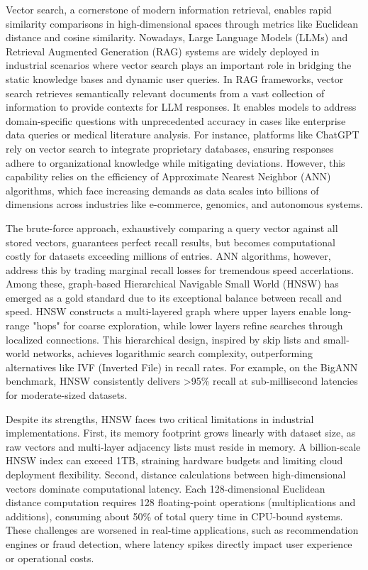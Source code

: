 \documentclass[sigconf, nonacm]{acmart}
\begin{document}
Vector search, a cornerstone of modern information retrieval, enables rapid similarity comparisons in high-dimensional spaces through metrics like Euclidean distance and cosine similarity.  Nowadays, Large Language Models (LLMs) and Retrieval Augmented Generation (RAG) \cite{lewis2020retrieval} systems are widely deployed in industrial scenarios where vector search plays an important role in bridging the static knowledge bases and dynamic user queries. In RAG frameworks, vector search retrieves semantically relevant documents from a vast collection of information to provide contexts for LLM responses. It enables models to address domain-specific questions with unprecedented accuracy in cases like enterprise data queries or medical literature analysis. For instance, platforms like ChatGPT rely on vector search to integrate proprietary databases, ensuring responses adhere to organizational knowledge while mitigating deviations. However, this capability relies on the efficiency of Approximate Nearest Neighbor (ANN) algorithms, which face increasing demands as data scales into billions of dimensions across industries like e-commerce, genomics, and autonomous systems.

The brute-force approach, exhaustively comparing a query vector against all stored vectors, guarantees perfect recall results, but becomes computational costly for datasets exceeding millions of entries. ANN algorithms, however, address this by trading marginal recall losses for tremendous speed accerlations. Among these, graph-based Hierarchical Navigable Small World (HNSW) has emerged as a gold standard due to its exceptional balance between recall and speed. HNSW constructs a multi-layered graph where upper layers enable long-range "hops" for coarse exploration, while lower layers refine searches through localized connections. This hierarchical design, inspired by skip lists and small-world networks, achieves logarithmic search complexity, outperforming alternatives like IVF (Inverted File) in recall rates. For example, on the BigANN benchmark, HNSW consistently delivers >95\% recall at sub-millisecond latencies for moderate-sized datasets.

Despite its strengths, HNSW faces two critical limitations in industrial implementations. First, its memory footprint grows linearly with dataset size, as raw vectors and multi-layer adjacency lists must reside in memory. A billion-scale HNSW index can exceed 1TB, straining hardware budgets and limiting cloud deployment flexibility. Second, distance calculations between high-dimensional vectors dominate computational latency. Each 128-dimensional Euclidean distance computation requires 128 floating-point operations (multiplications and additions), consuming about 50\% of total query time in CPU-bound systems. These challenges are worsened in real-time applications, such as recommendation engines or fraud detection, where latency spikes directly impact user experience or operational costs.
\end{document}
